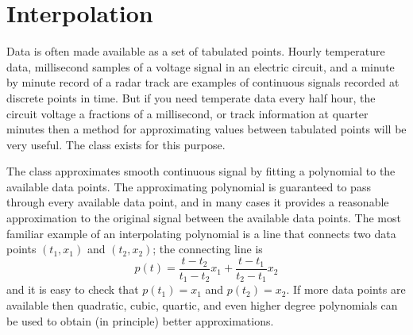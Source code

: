 \chapter{Interpolation}
Data is often made available as a set of tabulated points. Hourly temperature data, millisecond samples of a voltage signal in an electric circuit, and a minute by minute record of a radar track are examples of continuous signals recorded at discrete points in time. But if you need temperate data every half hour, the circuit voltage a fractions of a millisecond, or track information at quarter minutes then a method for approximating values between tabulated points will be very useful. The  class exists for this purpose.

The  class approximates smooth continuous signal by fitting a polynomial to the available data points. The approximating polynomial is guaranteed to pass through every available data point, and in many cases it provides a reasonable approximation to the original signal between the available data points. The most familiar example of an interpolating polynomial is a line that connects two data points $(t_1,x_1)$ and $(t_2,x_2)$; the connecting line is
\begin{equation*}
p(t)=\frac{t-t_2}{t_1-t_2}x_1 + \frac{t-t_1}{t_2-t_1}x_2
\end{equation*}
and it is easy to check that $p(t_1)=x_1$ and $p(t_2)=x_2$. If more data points are available then quadratic, cubic, quartic, and even higher degree polynomials can be used to obtain (in principle) better approximations.

